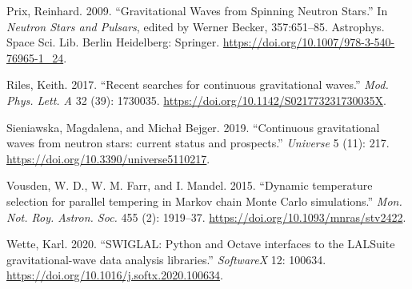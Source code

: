 \documentclass[10pt,a4paper,onecolumn]{article}
\begin{document}
\leavevmode\hypertarget{ref-Prix:2009oha}{}%
Prix, Reinhard. 2009. ``Gravitational Waves from Spinning Neutron
Stars.'' In \emph{Neutron Stars and Pulsars}, edited by Werner Becker,
357:651--85. Astrophys. Space Sci. Lib. Berlin Heidelberg: Springer.
\url{https://doi.org/10.1007/978-3-540-76965-1_24}.

\leavevmode\hypertarget{ref-Riles:2017evm}{}%
Riles, Keith. 2017. ``Recent searches for continuous gravitational
waves.'' \emph{Mod. Phys. Lett. A} 32 (39): 1730035.
\url{https://doi.org/10.1142/S021773231730035X}.

\leavevmode\hypertarget{ref-Sieniawska:2019hmd}{}%
Sieniawska, Magdalena, and Michał Bejger. 2019. ``Continuous
gravitational waves from neutron stars: current status and prospects.''
\emph{Universe} 5 (11): 217.
\url{https://doi.org/10.3390/universe5110217}.

\leavevmode\hypertarget{ref-Vousden:2015pte}{}%
Vousden, W. D., W. M. Farr, and I. Mandel. 2015. ``Dynamic temperature
selection for parallel tempering in Markov chain Monte Carlo
simulations.'' \emph{Mon. Not. Roy. Astron. Soc.} 455 (2): 1919--37.
\url{https://doi.org/10.1093/mnras/stv2422}.

\leavevmode\hypertarget{ref-Wette:2020air}{}%
Wette, Karl. 2020. ``SWIGLAL: Python and Octave interfaces to the
LALSuite gravitational-wave data analysis libraries.'' \emph{SoftwareX}
12: 100634. \url{https://doi.org/10.1016/j.softx.2020.100634}.
\end{document}
